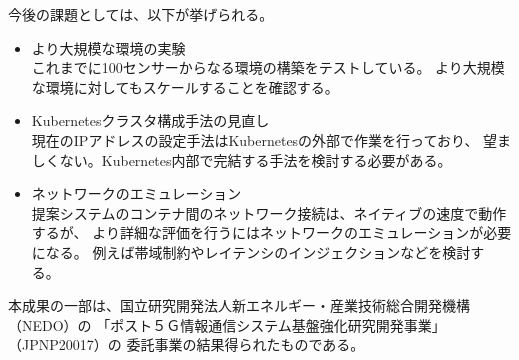 \documentclass[submit,techrep]{ipsj}
\newcommand{\kbs}{Kubernetes}
\begin{document}
今後の課題としては、以下が挙げられる。
\begin{itemize}
  \item より大規模な環境の実験\\
  これまでに100センサーからなる環境の構築をテストしている。
  より大規模な環境に対してもスケールすることを確認する。
  
  \item \kbs クラスタ構成手法の見直し\\
  現在のIPアドレスの設定手法は\kbs の外部で作業を行っており、
  望ましくない。\kbs 内部で完結する手法を検討する必要がある。

  \item ネットワークのエミュレーション\\
  提案システムのコンテナ間のネットワーク接続は、ネイティブの速度で動作するが、
  より詳細な評価を行うにはネットワークのエミュレーションが必要になる。
  例えば帯域制約やレイテンシのインジェクションなどを検討する。

\end{itemize}

\begin{acknowledgment}
本成果の一部は、国立研究開発法人新エネルギー・産業技術総合開発機構（NEDO）の
「ポスト５Ｇ情報通信システム基盤強化研究開発事業」（JPNP20017）の
委託事業の結果得られたものである。
\end{acknowledgment}



\end{document}
